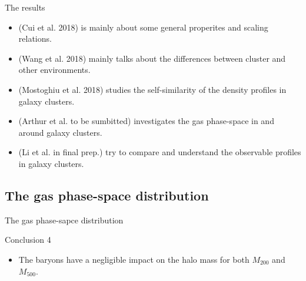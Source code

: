 \documentclass[aspectratio=43]{beamer}
\begin{document}
\begin{frame}
  \begin{center}
    {\Huge The results} \\
    \bigskip
  \end{center}

  \begin{itemize}
      \item     \hyperlink{intropaper}{} (Cui et al. 2018) is mainly about some general properites and scaling relations.
      \item \hyperlink{Wang}{} (Wang et al. 2018)  mainly talks about the differences between cluster and other environments.
      \item \hyperlink{Mostoghiu}{} (Mostoghiu et al. 2018) studies the self-similarity of the density profiles in galaxy clusters.
      \item \hyperlink{Arthur}{} (Arthur et al. to be sumbitted) investigates the gas phase-space in and around galaxy clusters.
      \item \hyperlink{Li}{} (Li et al. in final prep.) try to compare and understand the observable profiles in galaxy clusters.
  \end{itemize}
\end{frame}

\subsection{The gas phase-space distribution}\label{Arthur}
\begin{frame}{The gas phase-sapce distribution}

\end{frame}
\begin{frame}{Conclusion 4}
  \begin{itemize}
    \item The baryons have a negligible impact on the halo mass for both $M_{200}$ and $M_{500}$.
  \end{itemize}
    \begin{center}
    \hyperlink{lastpage}{}    
  \end{center}
\end{frame}
\end{document}

